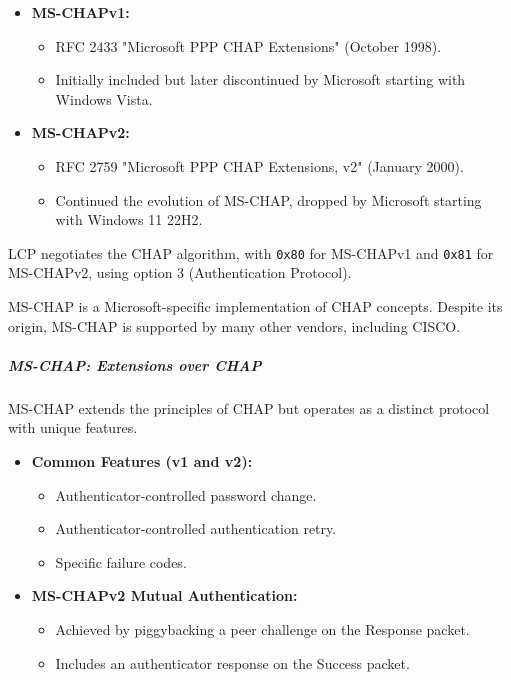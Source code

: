 \begin{itemize}
    \item \textbf{MS-CHAPv1:}
          \begin{itemize}
              \item RFC 2433 "Microsoft PPP CHAP Extensions" (October 1998).
              \item Initially included but later discontinued by Microsoft starting with Windows Vista.
          \end{itemize}

    \item \textbf{MS-CHAPv2:}
          \begin{itemize}
              \item RFC 2759 "Microsoft PPP CHAP Extensions, v2" (January 2000).
              \item Continued the evolution of MS-CHAP, dropped by Microsoft starting with Windows 11 22H2.
          \end{itemize}
\end{itemize}

LCP negotiates the CHAP algorithm, with \texttt{0x80} for MS-CHAPv1 and \texttt{0x81} for MS-CHAPv2, using option 3 (Authentication Protocol).

MS-CHAP is a Microsoft-specific implementation of CHAP concepts.
Despite its origin, MS-CHAP is supported by many other vendors, including CISCO.


\subparagraph{MS-CHAP: Extensions over CHAP}
MS-CHAP extends the principles of CHAP but operates as a distinct protocol with unique features.

\begin{itemize}
    \item \textbf{Common Features (v1 and v2):}
          \begin{itemize}
              \item Authenticator-controlled password change.
              \item Authenticator-controlled authentication retry.
              \item Specific failure codes.
          \end{itemize}

    \item \textbf{MS-CHAPv2 Mutual Authentication:}
          \begin{itemize}
              \item Achieved by piggybacking a peer challenge on the Response packet.
              \item Includes an authenticator response on the Success packet.
          \end{itemize}
\end{itemize}


